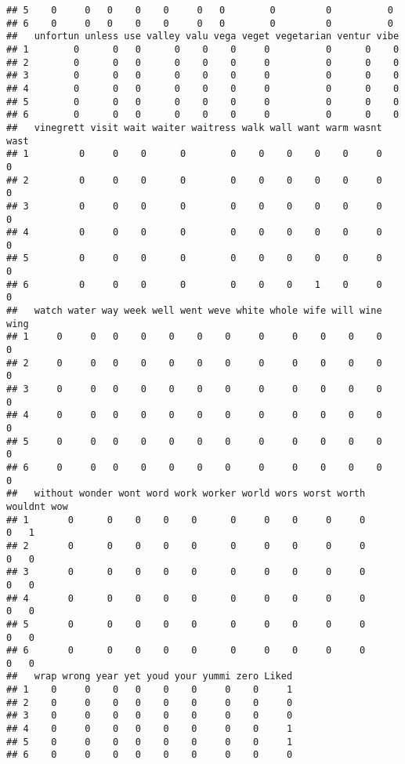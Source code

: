 \documentclass[]{article}
\begin{document}
\begin{verbatim}
## 5    0     0   0    0    0     0   0        0         0          0
## 6    0     0   0    0    0     0   0        0         0          0
##   unfortun unless use valley valu vega veget vegetarian ventur vibe
## 1        0      0   0      0    0    0     0          0      0    0
## 2        0      0   0      0    0    0     0          0      0    0
## 3        0      0   0      0    0    0     0          0      0    0
## 4        0      0   0      0    0    0     0          0      0    0
## 5        0      0   0      0    0    0     0          0      0    0
## 6        0      0   0      0    0    0     0          0      0    0
##   vinegrett visit wait waiter waitress walk wall want warm wasnt wast
## 1         0     0    0      0        0    0    0    0    0     0    0
## 2         0     0    0      0        0    0    0    0    0     0    0
## 3         0     0    0      0        0    0    0    0    0     0    0
## 4         0     0    0      0        0    0    0    0    0     0    0
## 5         0     0    0      0        0    0    0    0    0     0    0
## 6         0     0    0      0        0    0    0    1    0     0    0
##   watch water way week well went weve white whole wife will wine wing
## 1     0     0   0    0    0    0    0     0     0    0    0    0    0
## 2     0     0   0    0    0    0    0     0     0    0    0    0    0
## 3     0     0   0    0    0    0    0     0     0    0    0    0    0
## 4     0     0   0    0    0    0    0     0     0    0    0    0    0
## 5     0     0   0    0    0    0    0     0     0    0    0    0    0
## 6     0     0   0    0    0    0    0     0     0    0    0    0    0
##   without wonder wont word work worker world wors worst worth wouldnt wow
## 1       0      0    0    0    0      0     0    0     0     0       0   1
## 2       0      0    0    0    0      0     0    0     0     0       0   0
## 3       0      0    0    0    0      0     0    0     0     0       0   0
## 4       0      0    0    0    0      0     0    0     0     0       0   0
## 5       0      0    0    0    0      0     0    0     0     0       0   0
## 6       0      0    0    0    0      0     0    0     0     0       0   0
##   wrap wrong year yet youd your yummi zero Liked
## 1    0     0    0   0    0    0     0    0     1
## 2    0     0    0   0    0    0     0    0     0
## 3    0     0    0   0    0    0     0    0     0
## 4    0     0    0   0    0    0     0    0     1
## 5    0     0    0   0    0    0     0    0     1
## 6    0     0    0   0    0    0     0    0     0
\end{verbatim}
\end{document}

